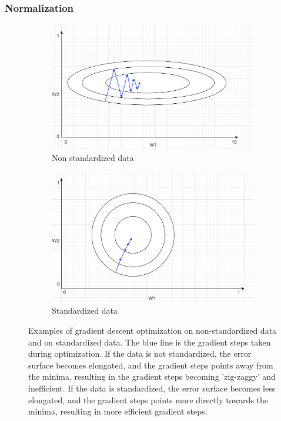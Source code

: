 \subsubsection{Normalization}
\begin{figure}[H]
	\begin{subfigure}{0.48\linewidth}
		\centering
		\includegraphics[width=\linewidth]{Materials/Theory/Normalization1}
		\caption{Non standardized data}
		\label{normalizationexamplea}
	\end{subfigure}
	\hfill
	\begin{subfigure}{0.48\linewidth}
		\centering
		\includegraphics[width=\linewidth]{Materials/Theory/Normalization2}
		\caption{Standardized data}
		\label{normalizationexampleb}
	\end{subfigure}
	\caption{Examples of gradient descent optimization on non-standardized data and on standardized data. The blue line is the gradient steps taken during optimization. If the data is not standardized, the error surface becomes elongated, and the gradient steps points away from the minima, resulting in the gradient steps becoming 'zig-zaggy' and inefficient. If the data is standardized, the error surface becomes less elongated, and the gradient steps points more directly towards the minima, resulting in more efficient gradient steps.}
\end{figure}
